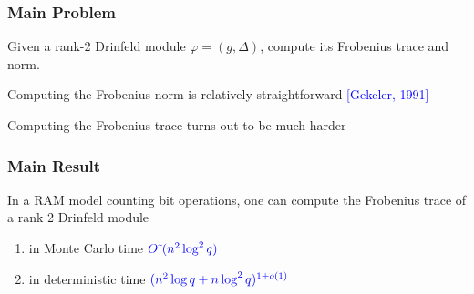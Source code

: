 \documentclass{beamer}
\newcommand{\f}{\mathbb{F}}
\newcommand{\blue}{\textcolor{blue}}
\newcommand{\spa}{\vspace{0.2cm}}
\begin{document}
\begin{frame}
\frametitle{Main Problem}

\begin{problem}
Given a rank-2 Drinfeld module $\varphi = (g,\Delta)$, compute its Frobenius trace and norm.
\end{problem}

\spa

 Computing the Frobenius norm is relatively straightforward \blue{[Gekeler, 1991]}
 
 \spa
 
 Computing the Frobenius trace turns out to be much harder

\end{frame}










\begin{frame}
\frametitle{Main Result}




\begin{theorem}
In a RAM model counting bit operations, one can compute the Frobenius trace of a rank 2 Drinfeld module
\begin{enumerate}
\item in Monte Carlo time $\blue{O\tilde{~}(n^2 \log^2 q)}$
\item in deterministic time $\blue{(n^2 \log q + n \log^2 q)^{1+o(1)}}$

\end{enumerate}
\end{theorem}



\end{frame}
\end{document}
